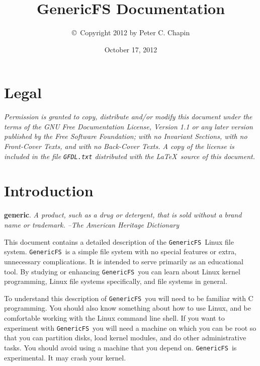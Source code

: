\documentclass[twocolumn]{article}
\newcommand{\GenericFS}{\texttt{GenericFS}}
\begin{document}
\lstset{language=C,
        stringstyle=\ttfamily,
        showstringspaces=false}

\title{GenericFS Documentation}
\author{\copyright\ Copyright 2012 by Peter C. Chapin}
\date{October 17, 2012}
\maketitle

\tableofcontents

\section*{Legal}
\label{sec:legal}

\textit{Permission is granted to copy, distribute and/or modify this document under the terms of
the GNU Free Documentation License, Version 1.1 or any later version published by the Free
Software Foundation; with no Invariant Sections, with no Front-Cover Texts, and with no
Back-Cover Texts. A copy of the license is included in the file \texttt{GFDL.txt} distributed
with the \LaTeX\ source of this document.}

\section{Introduction}
\label{sec:intro}

\textbf{generic}. \textit{A product, such as a drug or detergent, that is sold without a brand
name or trademark. --The American Heritage Dictionary}

This document contains a detailed description of the \GenericFS\ Linux file system. \GenericFS\
is a simple file system with no special features or extra, unnecessary complications. It is
intended to serve primarily as an educational tool. By studying or enhancing \GenericFS\ you can
learn about Linux kernel programming, Linux file systems specifically, and file systems in
general.

To understand this description of \GenericFS\ you will need to be familiar with C programming.
You should also know something about how to use Linux, and be comfortable working with the Linux
command line shell. If you want to experiment with \GenericFS\ you will need a machine on which
you can be root so that you can partition disks, load kernel modules, and do other
administrative tasks. You should avoid using a machine that you depend on. \GenericFS\ is
experimental. It may crash your kernel.







\end{document}
